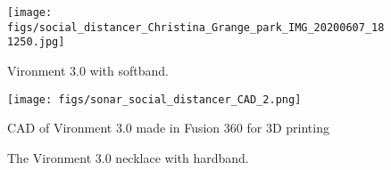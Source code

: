 \documentclass[journal]{journal}
\begin{document}

\begin{figure}
\texttt{[image: figs/social\_distancer\_Christina\_Grange\_park\_IMG\_20200607\_181250.jpg]}
    \caption{Vironment 3.0 with softband.}
\label{fig:softband}
\end{figure}

\begin{figure}
\texttt{[image: figs/sonar\_social\_distancer\_CAD\_2.png]}
    \caption{CAD of Vironment 3.0 made in Fusion 360 for 3D printing}
\label{fig:sonar_social}
\end{figure}


\begin{figure*} %
\centering
{}
\hfil
{}
\caption{The Vironment 3.0 necklace with hardband.}
\label{fig:necklace}
\end{figure*}



\end{document}
